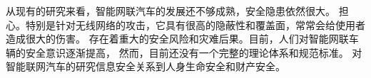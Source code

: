 从现有的研究来看，智能网联汽车的发展还不够成熟，安全隐患依然很大。
担心。特别是针对无线网络的攻击，它具有很高的隐蔽性和覆盖面，常常会给使用者造成很大的伤害。
存在着重大的安全风险和灾难后果。目前，人们对智能网联车辆的安全意识逐渐提高，
然而，目前还没有一个完整的理论体系和规范标准。
对智能联网汽车的研究信息安全关系到人身生命安全和财产安全。
